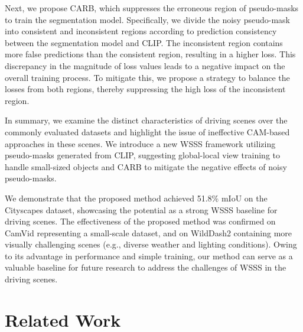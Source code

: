 \documentclass[letterpaper]{article} %
\def\eg{e.g.} \def\Eg{E.g.}
\begin{document}
Next, we propose CARB, which suppresses the erroneous region of pseudo-masks to train the segmentation model. Specifically, we divide the noisy pseudo-mask into consistent and inconsistent regions according to prediction consistency between the segmentation model and CLIP. The inconsistent region contains more false predictions than the consistent region, resulting in a higher loss. This discrepancy in the magnitude of loss values leads to a negative impact on the overall training process. To mitigate this, we propose a strategy to balance the losses from both regions, thereby suppressing the high loss of the inconsistent region.

In summary, we examine the distinct characteristics of driving scenes over the commonly evaluated datasets and highlight the issue of ineffective CAM-based approaches in these scenes. We introduce a new WSSS framework utilizing pseudo-masks generated from CLIP, suggesting global-local view training to handle small-sized objects and CARB to mitigate the negative effects of noisy pseudo-masks.

We demonstrate that the proposed method achieved 51.8\% mIoU on the Cityscapes dataset, showcasing the potential as a strong WSSS baseline for driving scenes. The effectiveness of the proposed method was confirmed on CamVid representing a small-scale dataset, and on WildDash2 containing more visually challenging scenes (\eg, diverse weather and lighting conditions). Owing to its advantage in performance and simple training, our method can serve as a valuable baseline for future research to address the challenges of WSSS in the driving scenes.

\section{Related Work}
\end{document}
